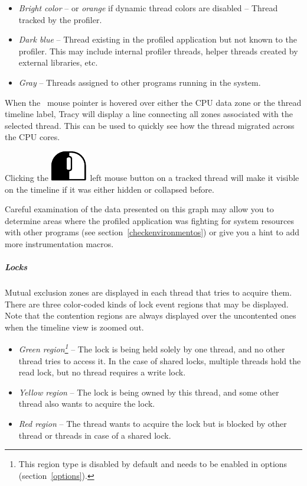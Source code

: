 \documentclass[hidelinks,titlepage,a4paper]{article}
\newcommand{\LMB}{\includegraphics[height=.8\baselineskip]{icons/lmb}}
\begin{document}
\begin{itemize}
\item \emph{Bright color} -- or \emph{orange} if dynamic thread colors are disabled -- Thread tracked by the profiler.
\item \emph{Dark blue} -- Thread existing in the profiled application but not known to the profiler. This may include internal profiler threads, helper threads created by external libraries, etc.
\item \emph{Gray} -- Threads assigned to other programs running in the system.
\end{itemize}

When the \faMousePointer{}~mouse pointer is hovered over either the CPU data zone or the thread timeline label, Tracy will display a line connecting all zones associated with the selected thread. This can be used to quickly see how the thread migrated across the CPU cores.

Clicking the \LMB{}~left mouse button on a tracked thread will make it visible on the timeline if it was either hidden or collapsed before.

Careful examination of the data presented on this graph may allow you to determine areas where the profiled application was fighting for system resources with other programs (see section~\ref{checkenvironmentos}) or give you a hint to add more instrumentation macros.

\subparagraph{Locks}

Mutual exclusion zones are displayed in each thread that tries to acquire them. There are three color-coded kinds of lock event regions that may be displayed. Note that the contention regions are always displayed over the uncontented ones when the timeline view is zoomed out.

\begin{itemize}
\item \emph{Green region\footnote{This region type is disabled by default and needs to be enabled in options (section~\ref{options}).}} -- The lock is being held solely by one thread, and no other thread tries to access it. In the case of shared locks, multiple threads hold the read lock, but no thread requires a write lock.
\item \emph{Yellow region} -- The lock is being owned by this thread, and some other thread also wants to acquire the lock.
\item \emph{Red region} -- The thread wants to acquire the lock but is blocked by other thread or threads in case of a shared lock.
\end{itemize}
\end{document}
